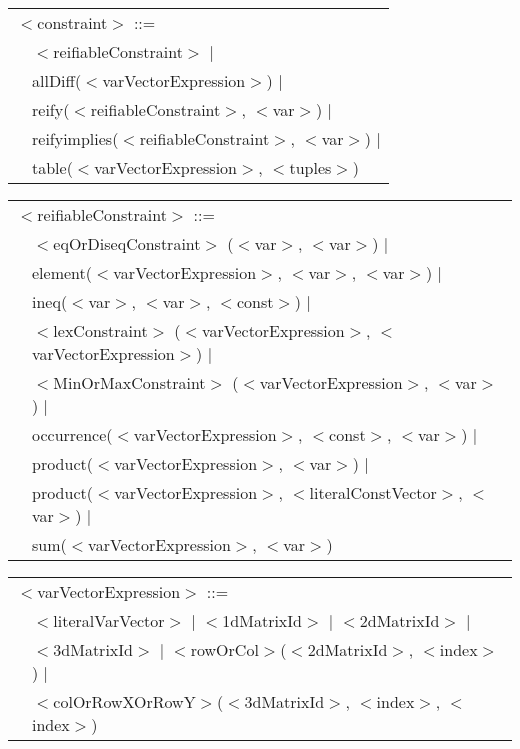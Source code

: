\documentclass{article}
\begin{document}
\begin{small}
\noindent
\setlength{\tabcolsep}{0mm}
\begin{tabular}{ll}
\multicolumn{2}{l}{$<$constraint$>$ ::=}\\
\hspace*{2mm} & $<$reifiableConstraint$>$ $|$\\
              & allDiff($<$varVectorExpression$>$) $|$\\
              & reify($<$reifiableConstraint$>$, $<$var$>$) $|$\\
              & reifyimplies($<$reifiableConstraint$>$, $<$var$>$) $|$\\
              & table($<$varVectorExpression$>$, $<$tuples$>$)\\
\end{tabular}
\vspace*{1mm}

\noindent
\setlength{\tabcolsep}{0mm}
\begin{tabular}{ll}
\multicolumn{2}{l}{$<$reifiableConstraint$>$ ::=}\\
\hspace*{2mm} & $<$eqOrDiseqConstraint$>$ ($<$var$>$, $<$var$>$) $|$\\
              & element($<$varVectorExpression$>$, $<$var$>$, $<$var$>$) $|$\\
              & ineq($<$var$>$, $<$var$>$, $<$const$>$) $|$\\
              & $<$lexConstraint$>$ ($<$varVectorExpression$>$, $<$varVectorExpression$>$) $|$\\
              & $<$MinOrMaxConstraint$>$ ($<$varVectorExpression$>$, $<$var$>$) $|$\\
              & occurrence($<$varVectorExpression$>$, $<$const$>$, $<$var$>$) $|$\\
              & product($<$varVectorExpression$>$, $<$var$>$) $|$\\
              & product($<$varVectorExpression$>$, $<$literalConstVector$>$, $<$var$>$) $|$\\
              & sum($<$varVectorExpression$>$, $<$var$>$)
\end{tabular}

\noindent
\setlength{\tabcolsep}{0mm}
\begin{tabular}{ll}
\multicolumn{2}{l}{$<$varVectorExpression$>$ ::=}\\
\hspace*{2mm} & $<$literalVarVector$>$ $|$ $<$1dMatrixId$>$ $|$ $<$2dMatrixId$>$ $|$\\
              & $<$3dMatrixId$>$ $|$ $<$rowOrCol$>$($<$2dMatrixId$>$, $<$index$>$) $|$\\
              & $<$colOrRowXOrRowY$>$($<$3dMatrixId$>$, $<$index$>$, $<$index$>$)
\end{tabular}


\end{small}
\end{document}
